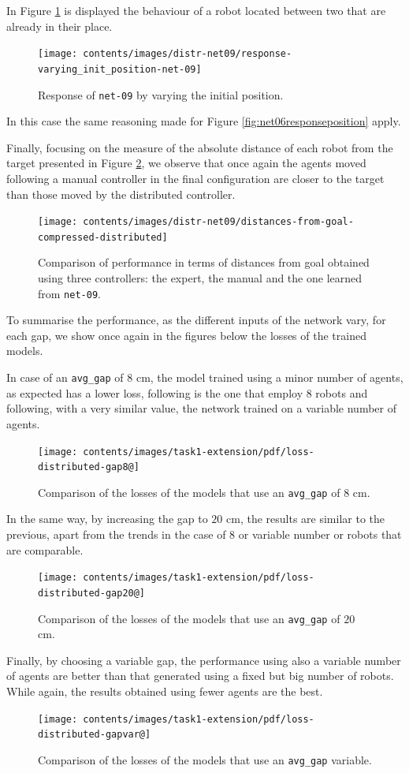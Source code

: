 In Figure \ref{fig:net09responseposition} is displayed the behaviour of a robot 
located between two that are already in their place.
\begin{figure}[!htb]
	\centering
	\texttt{[image: contents/images/distr-net09/response-varying\_init\_position-net-09]}%
	\caption{Response of \texttt{net-09} by varying the initial position.}
	\label{fig:net09responseposition}
\end{figure}
In this case the same reasoning made for Figure \ref{fig:net06responseposition} 
apply.

Finally, focusing on the measure of the absolute distance of each robot from the 
target presented in Figure \ref{fig:net09distance}, we observe that once again the 
agents moved following a manual controller in the final configuration are closer 
to the target than those moved by the distributed controller.
\begin{figure}[!htb]
	\centering
	\texttt{[image: contents/images/distr-net09/distances-from-goal-compressed-distributed]}%
	\caption[Evaluation of \texttt{net-09} distances from goal.]{Comparison of 
		performance in terms of distances from goal obtained using three 
		controllers: the expert, the manual and the one learned from 
		\texttt{net-09}.}
	\label{fig:net09distance}
\end{figure}

To summarise the performance, as the different inputs of the network 
vary, for each gap, we show once again in the figures below the losses of the 
trained models.

In case of an \texttt{avg\_gap} of $8$ \gls{cm}, the model trained using 
a minor number of agents, as expected has a lower loss, following is the one that 
employ 8 robots and following, with a very similar value, the network trained on a 
variable number of agents.
\begin{figure}[!htb]
	\centering
	\texttt{[image: contents/images/task1-extension/pdf/loss-distributed-gap8@]}%
	\caption{Comparison of the losses of the models that use an \texttt{avg\_gap} 
	of $8$ \gls{cm}.}
	\label{fig:distloss8-2}
\end{figure}

In the same way, by increasing the gap to $20$ \gls{cm}, the results are similar to 
the previous, apart from the trends in the case of 8 or variable number or robots 
that are comparable.
\begin{figure}[!htb]
	\centering
	\texttt{[image: contents/images/task1-extension/pdf/loss-distributed-gap20@]}%
	\caption{Comparison of the losses of the models that use an \texttt{avg\_gap} 
	of $20$ \gls{cm}.}
	\label{fig:distloss20}
\end{figure}

Finally, by choosing a variable gap, the performance using also a variable number 
of agents are better than that generated using a fixed but big number of robots. 
While again, the results obtained using fewer agents are the best.
\begin{figure}[!htb]
	\centering
	\texttt{[image: contents/images/task1-extension/pdf/loss-distributed-gapvar@]}%
	\caption{Comparison of the losses of the models that use an \texttt{avg\_gap} 
	variable.}
	\label{fig:distlossvar}
\end{figure}
